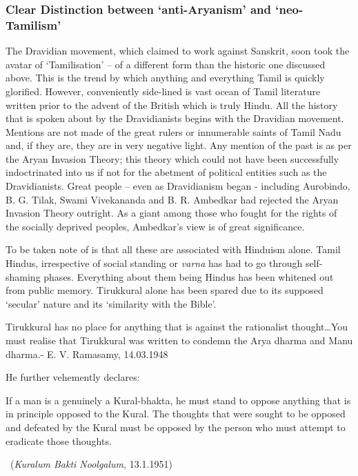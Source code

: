 \subsubsection*{Clear Distinction between ‘anti-Aryanism’ and ‘neo-Tamilism’}

The Dravidian movement, which claimed to work against Sanskrit, soon took the avatar of ‘Tamilisation’ – of a different form than the historic one discussed above. This is the trend by which anything and everything Tamil is quickly glorified. However, conveniently side-lined is vast ocean of Tamil literature written prior to the advent of the British which is truly Hindu. All the history that is spoken about by the Dravidianists begins with the Dravidian movement. Mentions are not made of the great rulers or innumerable saints of Tamil Nadu and, if they are, they are in very negative light. Any mention of the past is as per the Aryan Invasion Theory; this theory which could not have been successfully indoctrinated into us if not for the abetment of political entities such as the Dravidianists. Great people – even as Dravidianism began - including Aurobindo, B. G. Tilak, Swami Vivekananda and B. R. Ambedkar had rejected the Aryan Invasion Theory outright. As a giant among those who fought for the rights of the socially deprived peoples, Ambedkar’s view is of great significance. 

To be taken note of is that all these are associated with Hinduism alone. Tamil Hindus, irrespective of social standing or \textit{varna} has had to go through self-shaming phases. Everything about them being Hindus has been whitened out from public memory. Tirukkural alone has been spared due to its supposed ‘secular’ nature and its ‘similarity with the Bible’.

\begin{myquote}
Tirukkural has no place for anything that is against the rationalist thought…You must realise that Tirukkural was written to condemn the Arya dharma and Manu dharma.\hfill - E. V. Ramasamy, 14.03.1948
\end{myquote}

He further vehemently declares:

\begin{myquote}
If a man is a genuinely a Kural-bhakta, he must stand to oppose anything that is in principle opposed to the Kural. The thoughts that were sought to be opposed and defeated by the Kural must be opposed by the person who must attempt to eradicate those thoughts.

~\hfill (\textit{Kuralum Bakti Noolgalum}, 13.1.1951)
\end{myquote}

